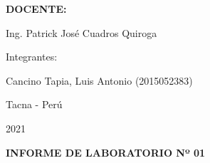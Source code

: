 \documentclass[12pt,letterpaper]{article}
\begin{document}
\begin{titlepage}
\begin{center}
\vspace*{0.3in}
\begin{Large}
\textbf{DOCENTE:} \\
\end{Large}

\vspace*{0.1in}
\begin{large}
Ing. Patrick José Cuadros Quiroga\\
\end{large}

\vspace*{0.2in}
\vspace*{0.1in}
\begin{large}
Integrantes: \\
\begin{flushleft}

Cancino Tapia, Luis Antonio 		\hfill	(2015052383) \\

\end{flushleft}
\end{large}
\vspace*{0.1in}
\begin{large}
Tacna - Perú\\
\end{large}
\vspace*{0.1in}
\begin{large}
2021\\
\end{large}

\end{center}

\end{titlepage}


\vspace*{0.1in}

\begin{LARGE}
    \begin{center}
        \textbf{INFORME DE LABORATORIO Nº 01} \\
    \end{center}
\end{LARGE}
\vspace*{0.1in}
\end{document}
